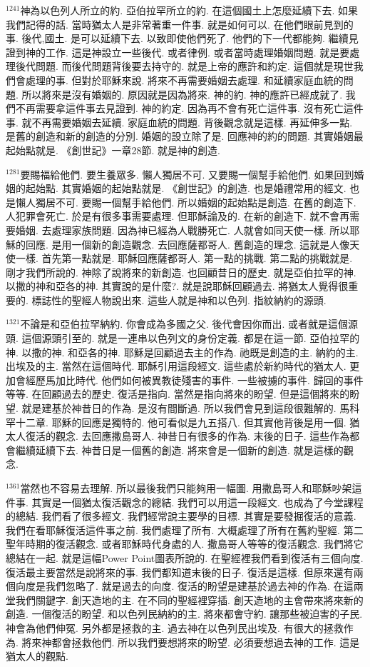 \documentclass{book}
\begin{document}
$^{1241}$神為以色列人所立的約.
亞伯拉罕所立的約.
在這個國土上怎麼延續下去.
如果我們記得的話.
當時猶太人是非常著重一件事.
就是如何可以.
在他們眼前見到的事.
後代,國土.
是可以延續下去.
以致即使他們死了.
他們的下一代都能夠.
繼續見證到神的工作.
這是神設立一些後代.
或者律例.
或者當時處理婚姻問題.
就是要處理後代問題.
而後代問題背後要去持守的.
就是上帝的應許和約定.
這個就是現世我們會處理的事.
但對於耶穌來說.
將來不再需要婚姻去處理.
和延續家庭血統的問題.
所以將來是沒有婚姻的.
原因就是因為將來.
神的約.
神的應許已經成就了.
我們不再需要拿這件事去見證到.
神的約定.
因為再不會有死亡這件事.
沒有死亡這件事.
就不再需要婚姻去延續.
家庭血統的問題.
背後觀念就是這樣.
再延伸多一點.
是舊的創造和新的創造的分別.
婚姻的設立除了是.
回應神的約的問題.
其實婚姻最起始點就是.
《創世記》一章28節.
就是神的創造.

$^{1281}$要賜福給他們.
要生養眾多.
懶人獨居不可.
又要賜一個幫手給他們.
如果回到婚姻的起始點.
其實婚姻的起始點就是.
《創世記》的創造.
也是婚禮常用的經文.
也是懶人獨居不可.
要賜一個幫手給他們.
所以婚姻的起始點是創造.
在舊的創造下.
人犯罪會死亡.
於是有很多事需要處理.
但耶穌論及的.
在新的創造下.
就不會再需要婚姻.
去處理家族問題.
因為神已經為人戰勝死亡.
人就會如同天使一樣.
所以耶穌的回應.
是用一個新的創造觀念.
去回應薩都哥人.
舊創造的理念.
這就是人像天使一樣.
首先第一點就是.
耶穌回應薩都哥人.
第一點的挑戰.
第二點的挑戰就是.
剛才我們所說的.
神除了說將來的新創造.
也回顧昔日的歷史.
就是亞伯拉罕的神.
以撒的神和亞各的神.
其實說的是什麼?.
就是說耶穌回顧過去.
將猶太人覺得很重要的.
標誌性的聖經人物說出來.
這些人就是神和以色列.
指紋納約的源頭.

$^{1321}$不論是和亞伯拉罕納約.
你會成為多國之父.
後代會因你而出.
或者就是這個源頭.
這個源頭引至的.
就是一連串以色列文的身份定義.
都是在這一節.
亞伯拉罕的神.
以撒的神.
和亞各的神.
耶穌是回顧過去主的作為.
祂既是創造的主.
納約的主.
出埃及的主.
當然在這個時代.
耶穌引用這段經文.
這些處於新約時代的猶太人.
更加會經歷馬加比時代.
他們如何被異教徒殘害的事件.
一些被擄的事件.
歸回的事件等等.
在回顧過去的歷史.
復活是指向.
當然是指向將來的盼望.
但是這個將來的盼望.
就是建基於神昔日的作為.
是沒有間斷過.
所以我們會見到這段很難解的.
馬科罕十二章.
耶穌的回應是獨特的.
他可看似是九五搭八.
但其實他背後是用一個.
猶太人復活的觀念.
去回應撒島哥人.
神昔日有很多的作為.
末後的日子.
這些作為都會繼續延續下去.
神昔日是一個舊的創造.
將來會是一個新的創造.
就是這樣的觀念.

$^{1361}$當然也不容易去理解.
所以最後我們只能夠用一幅圖.
用撒島哥人和耶穌吵架這件事.
其實是一個猶太復活觀念的總結.
我們可以用這一段經文.
也成為了今堂課程的總結.
我們看了很多經文.
我們經常說主要學的目標.
其實是要發掘復活的意義.
我們在看耶穌復活這件事之前.
我們處理了所有.
大概處理了所有在舊約聖經.
第二聖年時期的復活觀念.
或者耶穌時代身處的人.
撒島哥人等等的復活觀念.
我們將它總結在一起.
就是這幅Power Point圖表所說的.
在聖經裡我們看到復活有三個向度.
復活最主要當然是說將來的事.
我們都知道末後的日子.
復活是這樣.
但原來還有兩個向度是我們忽略了.
就是過去的向度.
復活的盼望是建基於過去神的作為.
在這兩堂我們關鍵字.
創天造地的主.
在不同的聖經裡穿插.
創天造地的主會帶來將來新的創造.
一個復活的盼望.
和以色列民納約的主.
將來都會守約.
讓那些被迫害的子民.
神會為他們伸冤.
另外都是拯救的主.
過去神在以色列民出埃及.
有很大的拯救作為.
將來神都會拯救他們.
所以我們要想將來的盼望.
必須要想過去神的工作.
這是猶太人的觀點.
\end{document}
